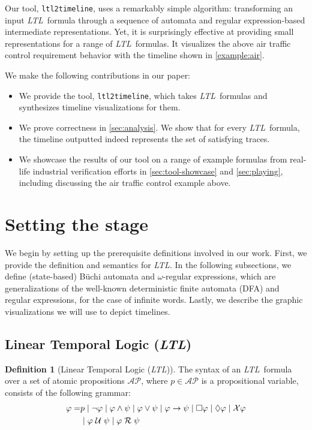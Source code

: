 \documentclass[conference]{IEEEtran}
\theoremstyle{definition}
\newtheorem{definition}{Definition}[section]
\theoremstyle{remark}
\newcommand{\AP}{\mathcal{AP}}
\newcommand{\always}{\Box}
\newcommand{\eventually}{\Diamond}
\newcommand{\nextt}{\mathcal{X}}
\newcommand{\limplies}{\rightarrow}
\newcommand{\ltl}{\textit{LTL}}
\newcommand{\Buchi}{B\"{u}chi }
\newcommand{\stronguntil}{\hspace{0.1cm} \mathcal{U}  \hspace{0.1cm}}
\newcommand{\weakrelease}{\hspace{0.1cm} \mathcal{R} \hspace{0.1cm}}
\newcommand{\tool}{\texttt{ltl2timeline}}
\begin{document}
Our tool, \tool, uses a remarkably simple algorithm: transforming an input \ltl\ formula through a sequence of automata and regular expression-based intermediate representations. Yet, it is surprisingly effective at providing small representations for a range of \ltl\ formulas. It visualizes the above air traffic control requirement behavior with the timeline shown in \cref{example:air}.

We make the following contributions in our paper:
\begin{itemize}
    \item We provide the tool, \tool, which takes \ltl\ formulas and synthesizes timeline visualizations for them.
    \item We prove correctness in \cref{sec:analysis}. We show that for every \ltl\ formula, the timeline outputted indeed represents the set of satisfying traces.
    \item We showcase the results of our tool on a range of example formulas from real-life industrial verification efforts in \cref{sec:tool-showcase} and \cref{sec:playing}, including discussing the air traffic control example above.
\end{itemize}

\section{Setting the stage}

We begin by setting up the prerequisite definitions involved in our work.
First, we provide the definition and semantics for \ltl. In the following subsections, we define (state-based) \Buchi automata and $\omega$-regular expressions, which are generalizations of the well-known deterministic finite automata (DFA) and regular expressions, for the case of infinite words. Lastly, we describe the graphic visualizations we will use to depict timelines.

\subsection{Linear Temporal Logic (\ltl)} \label{sec:ltl}

\begin{definition}[Linear Temporal Logic (\ltl)]
    The syntax of an \ltl\ formula over a set of atomic propositions $\AP$, where $p\in\AP$ is a propositional variable, consists of the following grammar:
    \begin{align*}
        \varphi = & p \mid \neg \varphi \mid \varphi \land \psi \mid \varphi \lor \psi \mid \varphi \limplies \psi \mid \always \varphi \mid \eventually \varphi \mid \nextt \varphi \\ & \mid \varphi \stronguntil \psi \mid \varphi \weakrelease \psi
    \end{align*}\label{ltl-defn}
\end{definition}
\end{document}
